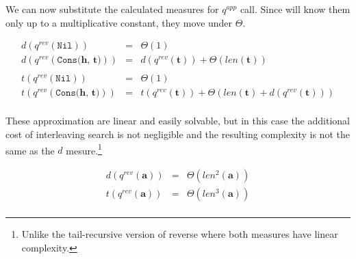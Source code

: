 We can now substitute the calculated measures for $q^{app}$ call. Since will know them only up to a multiplicative constant, they move under $\Theta$.

\[
\begin{array}{lcl}
d(q^{rev}(\texttt{Nil})) & = & \Theta(1) \\
d(q^{rev}(\texttt{Cons($\mathbf{h}$, $\mathbf{t}$)})) & = & d(q^{rev}(\mathbf{t})) + \Theta(len(\mathbf{t})) \\
\\
t(q^{rev}(\texttt{Nil})) & = & \Theta(1) \\
t(q^{rev}(\texttt{Cons($\mathbf{h}$, $\mathbf{t}$)})) & = & t(q^{rev}(\mathbf{t})) + \Theta(len(\mathbf{t}) + d(q^{rev}(\mathbf{t}))) \\
\end{array}
 \]
 
These approximation are linear and easily solvable, but in this case the additional cost of interleaving search is not negligible and the resulting complexity is not the same as the $d$ mesure.\footnote{Unlike the tail-recursive version of reverse where both measures have linear complexity.}
 
 \[
\begin{array}{lcl}
d(q^{rev}(\mathbf{a})) & = & \Theta(len^2(\mathbf{a})) \\
t(q^{rev}(\mathbf{a})) & = & \Theta(len^3(\mathbf{a})) \\
\end{array}
 \]

